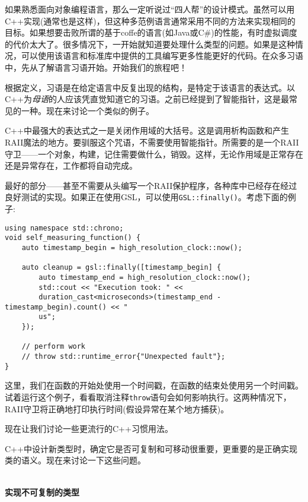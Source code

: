 
如果熟悉面向对象编程语言，那么一定听说过“四人帮”的设计模式。虽然可以用C++实现(通常也是这样)，但这种多范例语言通常采用不同的方法来实现相同的目标。如果想要击败所谓的基于coffe的语言(如Java或C\#)的性能，有时虚拟调度的代价太大了。很多情况下，一开始就知道要处理什么类型的问题。如果是这种情况，可以使用该语言和标准库中提供的工具编写更多性能更好的代码。在众多习语中，先从了解语言习语开始。开始我们的旅程吧！

根据定义，习语是在给定语言中反复出现的结构，是特定于该语言的表达式。以C++为\textit{母语}的人应该凭直觉知道它的习语。之前已经提到了智能指针，这是最常见的一种。现在来讨论一个类似的例子。


C++中最强大的表达式之一是关闭作用域的大括号。这是调用析构函数和产生RAII魔法的地方。要驯服这个咒语，不需要使用智能指针。所需要的是一个RAII守卫——一个对象，构建，记住需要做什么，销毁。这样，无论作用域是正常存在还是异常存在，工作都将自动完成。

最好的部分——甚至不需要从头编写一个RAII保护程序，各种库中已经存在经过良好测试的实现。如果正在使用GSL，可以使用\texttt{GSL::finally()}。考虑下面的例子:

\begin{lstlisting}[style=styleCXX]
using namespace std::chrono;
void self_measuring_function() {
	auto timestamp_begin = high_resolution_clock::now();
	
	auto cleanup = gsl::finally([timestamp_begin] {
		auto timestamp_end = high_resolution_clock::now();
		std::cout << "Execution took: " <<
		duration_cast<microseconds>(timestamp_end - timestamp_begin).count() << "
		us";
	});

	// perform work
	// throw std::runtime_error{"Unexpected fault"};
}
\end{lstlisting}

这里，我们在函数的开始处使用一个时间戳，在函数的结束处使用另一个时间戳。试着运行这个例子，看看取消注释\texttt{throw}语句会如何影响执行。这两种情况下，RAII守卫将正确地打印执行时间(假设异常在某个地方捕获)。

现在让我们讨论一些更流行的C++习惯用法。


C++中设计新类型时，确定它是否可复制和可移动很重要，更重要的是正确实现类的语义。现在来讨论一下这些问题。

\hspace*{\fill} \\ %
\noindent
\textbf{实现不可复制的类型}

